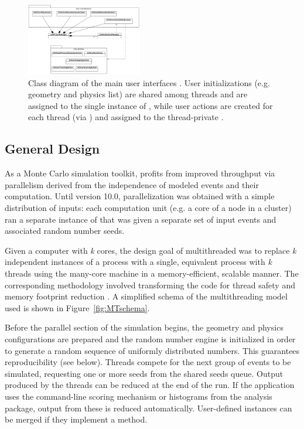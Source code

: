 \begin{figure}[htb]
    \includegraphics[width=0.45\textwidth]{figures/MTGeneralPaper2.pdf}
  \caption{Class diagram of the main user interfaces \cite{MT:TDG}. 
           User initializations (e.g. geometry and physics list) are shared
           among threads and are assigned to the single instance of
           , while user actions are created for each 
           thread (via ) and assigned to 
           the thread-private .}
  \label{fig:design}
\end{figure}

\subsection{\textbf{General Design}}
As a Monte Carlo simulation toolkit, \Gfour{} profits from improved throughput
via parallelism derived from the independence of modeled events and their 
computation.  Until \Gfour{} version 10.0, parallelization was obtained with a
simple distribution of inputs: each computation unit (e.g. a core of a node in a
cluster) ran a separate instance of \Gfour{} that was given a separate set of 
input events and associated random number seeds.

Given a computer with {\it k} cores, the design goal of multithreaded \Gfour{} was
to replace {\it k} independent instances of a \Gfour{} process with a single, 
equivalent process with {\it k} threads using the many-core machine in a 
memory-efficient, scalable manner.  The corresponding methodology involved 
transforming the code for thread safety and memory footprint reduction
\cite{MT:SNA2013}.  A simplified schema of the multithreading model used is 
shown in Figure~\ref{fig:MTschema}.  

Before the parallel section of the simulation begins, the geometry and physics
configurations are prepared and the random number engine is initialized in order
to generate a random sequence of uniformly distributed numbers.  This guarantees
reproducibility (see below).  Threads compete for the next group of events to be 
simulated, requesting one or more seeds from the shared seeds queue.  Output 
produced by the threads can be reduced at the end of the run.  If the application
uses the command-line scoring mechanism or histograms from the \Gfour{} analysis 
package, output from these is reduced automatically.  User-defined 
 instances can be merged if they implement a  method.

